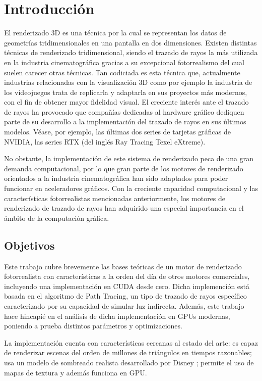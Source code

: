 \chapter{Introducción}
	
El renderizado 3D es una técnica por la cual se representan los datos de geometrías tridimensionales en una pantalla en dos dimensiones. Existen distintas técnicas de renderizado tridimensional, siendo el trazado de rayos la más utilizada en la industria cinematográfica gracias a su excepcional fotorrealismo del cual suelen carecer otras técnicas. Tan codiciada es esta técnica que, actualmente industrias relacionadas con la visualización 3D como por ejemplo la industria de los videojuegos trata de replicarla y adaptarla en sus proyectos más modernos, con el fin de obtener mayor fidelidad visual.
El creciente interés ante el trazado de rayos ha provocado que compañías dedicadas al hardware gráfico dediquen parte de su desarrollo a la implementación del trazado de rayos en sus últimos modelos. Véase, por ejemplo, las últimas dos series de tarjetas gráficas de NVIDIA, las series RTX (del inglés Ray Tracing Texel eXtreme).

No obstante, la implementación de este sistema de renderizado peca de una gran demanda computacional, por lo que gran parte de los motores de renderizado orientados a la industria cinematográfica han sido adaptados para poder funcionar en aceleradores gráficos. Con la creciente capacidad computacional y las características fotorrealistas mencionadas anteriormente, los motores de renderizado de trazado de rayos han adquirido una especial importancia en el ámbito de la computación gráfica.



\section{Objetivos}

Este trabajo cubre brevemente las bases teóricas de un motor de renderizado fotorrealista con características a la orden del día de otros motores comerciales, incluyendo una implementación en CUDA desde cero. Dicha implemención está basada en el algoritmo de Path Tracing, un tipo de trazado de rayos específico caracterizado por su capacidad de simular luz indirecta. Además, este trabajo hace hincapié en el análisis de dicha implementación en GPUs modernas, poniendo a prueba distintos parámetros y optimizaciones.

La implementación cuenta con características cercanas al estado del arte: es capaz de renderizar escenas del orden de millones de triángulos en tiempos razonables; usa un modelo de sombreado realista desarrollado por Disney \cite{burley2012physically}; permite el uso de mapas de textura y además funciona en GPU.

